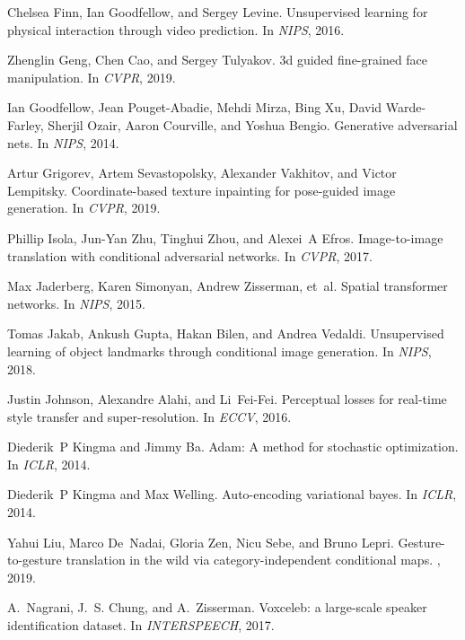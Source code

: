 \documentclass{article}
\begin{document}
\begin{thebibliography}{10}
	Chelsea Finn, Ian Goodfellow, and Sergey Levine.
	\newblock Unsupervised learning for physical interaction through video
	prediction.
	\newblock In {\em NIPS}, 2016.
	
	Zhenglin Geng, Chen Cao, and Sergey Tulyakov.
	\newblock 3d guided fine-grained face manipulation.
	\newblock In {\em CVPR}, 2019.
	
	Ian Goodfellow, Jean Pouget-Abadie, Mehdi Mirza, Bing Xu, David Warde-Farley,
	Sherjil Ozair, Aaron Courville, and Yoshua Bengio.
	\newblock Generative adversarial nets.
	\newblock In {\em NIPS}, 2014.
	
	Artur Grigorev, Artem Sevastopolsky, Alexander Vakhitov, and Victor Lempitsky.
	\newblock Coordinate-based texture inpainting for pose-guided image generation.
	\newblock In {\em CVPR}, 2019.
	
	Phillip Isola, Jun-Yan Zhu, Tinghui Zhou, and Alexei~A Efros.
	\newblock Image-to-image translation with conditional adversarial networks.
	\newblock In {\em CVPR}, 2017.
	
	Max Jaderberg, Karen Simonyan, Andrew Zisserman, et~al.
	\newblock Spatial transformer networks.
	\newblock In {\em NIPS}, 2015.
	
	Tomas Jakab, Ankush Gupta, Hakan Bilen, and Andrea Vedaldi.
	\newblock Unsupervised learning of object landmarks through conditional image
	generation.
	\newblock In {\em NIPS}, 2018.
	
	Justin Johnson, Alexandre Alahi, and Li~Fei-Fei.
	\newblock Perceptual losses for real-time style transfer and super-resolution.
	\newblock In {\em ECCV}, 2016.
	
	Diederik~P Kingma and Jimmy Ba.
	\newblock Adam: A method for stochastic optimization.
	\newblock In {\em ICLR}, 2014.
	
	Diederik~P Kingma and Max Welling.
	\newblock Auto-encoding variational bayes.
	\newblock In {\em ICLR}, 2014.
	
	Yahui Liu, Marco De~Nadai, Gloria Zen, Nicu Sebe, and Bruno Lepri.
	\newblock Gesture-to-gesture translation in the wild via category-independent
	conditional maps.
	, 2019.
	
	A.~Nagrani, J.~S. Chung, and A.~Zisserman.
	\newblock Voxceleb: a large-scale speaker identification dataset.
	\newblock In {\em INTERSPEECH}, 2017.
	

\end{thebibliography}
\end{document}
